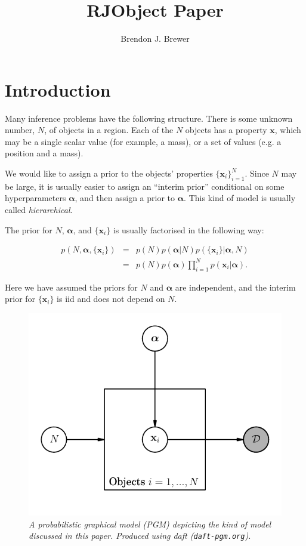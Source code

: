 \documentclass[letterpaper, 11pt]{article}
\title{RJObject Paper}
\author{Brendon J. Brewer}
\newcommand{\hyperparams}{\boldsymbol{\alpha}}
\newcommand{\xx}{\mathbf{x}}
\begin{document}
\maketitle
{}

\section{Introduction}
\setlength{\parindent}{0cm}
\setlength{\parskip}{3mm}
Many inference problems have the following structure. There is some unknown
number, $N$, of objects in a region. Each of the $N$ objects has a property
$\xx$, which may be a single scalar value (for example, a mass), or a set of
values (e.g. a position and a mass).

We would like to assign a prior to the objects' properties $\{\xx_i\}_{i=1}^N$.
Since $N$ may be large, it is usually easier to assign an ``interim prior''
conditional on some hyperparameters $\hyperparams$, and then assign a prior to
$\hyperparams$. This kind of model is usually called {\it hierarchical}.

The prior for $N$, $\hyperparams$, and $\{\xx_i\}$ is usually factorised
in the following way:

\begin{eqnarray}
p(N, \hyperparams, \{\xx_i\}) &=& p(N) p(\hyperparams | N) p(\{\xx_i\} | \hyperparams, N) \\
&=& p(N) p(\hyperparams) \prod_{i=1}^N p(\xx_i | \hyperparams).
\end{eqnarray}

Here we have assumed the priors for $N$ and $\hyperparams$ are independent, and
the interim prior for $\{\xx_i\}$ is iid and does not depend on $N$.

\begin{figure}
\begin{center}
\includegraphics{pgm.pdf}
\caption{\it A probabilistic graphical model (PGM) depicting the kind
of model discussed in this paper. Produced using daft ({\tt daft-pgm.org}).
\label{fig:pgm}}
\end{center}
\end{figure}
\end{document}
